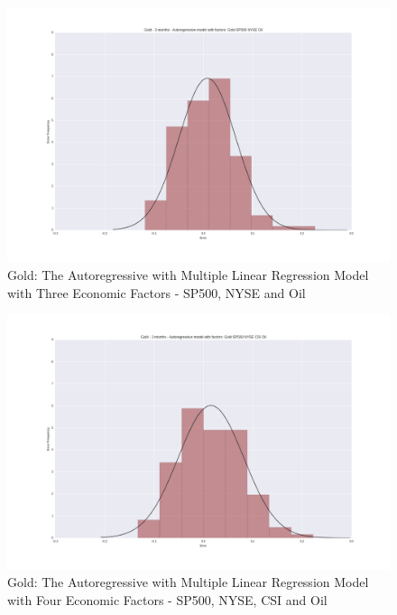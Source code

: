 \documentclass[runningheads]{llncs}
\begin{document}
\begin{figure}
\centering
\includegraphics[width=\textwidth]{Gold_SP500_NYSE_Oil.png}
\caption{Gold: The Autoregressive with Multiple Linear Regression Model with Three Economic Factors - SP500, NYSE and Oil}
\label{fig:Gold_SP500_NYSE_Oil.png}
\end{figure}

\begin{figure}
\centering
\includegraphics[width=\textwidth]{Gold_SP500_NYSE_CSI_Oil.png}
\caption{Gold: The Autoregressive with Multiple Linear Regression Model with Four Economic Factors - SP500, NYSE, CSI and Oil}
\label{fig:Gold_SP500_NYSE_CSI_Oil.png}
\end{figure}
\end{document}
